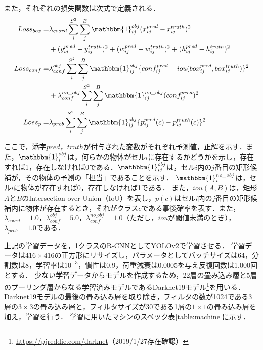     また，それぞれの損失関数は次式で定義される．
    \begin{align}
      Loss_{box} = &\lambda_{coord} \sum_{i}^{S^2} \sum_{j}^{B} \mathbbm{1}_{ij}^{obj} (x_{ij}^{pred} - x_{ij}^{truth})^2 \\
      &+ (y_{ij}^{pred} - y_{ij}^{truth})^2 + (w_{ij}^{pred} - w_{ij}^{truth})^2 + (h_{ij}^{pred} - h_{ij}^{truth})^2 \notag \\
      Loss_{conf} = &\lambda_{conf}^{obj} \sum_{i}^{S^2} \sum_{j}^{B} \mathbbm{1}_{ij}^{obj}
      \{ conf_{ij}^{pred} - iou(box_{ij}^{pred}, box_{ij}^{truth}) \}^2 \\
      &+ \lambda_{conf}^{no\_obj} \sum_{i}^{S^2} \sum_{j}^{B} \mathbbm{1}_{ij}^{no\_obj} (conf_{ij}^{pred})^2 \notag \\
      Loss_{p} = &\lambda_{prob} \sum_{i}^{S^2} \sum_{j}^{B} \mathbbm{1}_{ij}^{obj}
      \{ p_{ij}^{pred} (c) - p_{ij}^{truth} (c) \}^2
    \end{align}

    ここで，添字$pred$，$truth$が付与された変数がそれぞれ予測値，正解を示す．また，$\mathbbm{1}_{i}^{obj}$は，何らかの物体がセル$i$に存在するかどうかを示し，存在すれば1，存在しなければ0である．$\mathbbm{1}_{ij}^{obj}$は，セル$i$内の$j$番目の矩形候補が，その物体の予測の「担当」であることを示す．
    $\mathbbm{1}_{i}^{no\_obj}$は，セル$i$に物体が存在すれば0，存在しなければ1である．
    また，$iou(A, B)$は，矩形$A$と$B$のIntersection over Union（IoU）を表し，$p(c)$はセル$i$内の$j$番目の矩形候補内に物体が存在するとき，それがクラス$c$である事後確率を表す．また，$\lambda_{coord} = 1.0$，$\lambda_{conf}^{obj} = 5.0$，$\lambda_{conf}^{no\_obj} = 1.0$（ただし，$iou$が閾値未満のとき），$\lambda_{prob} = 1.0$である\cite{Nishikawa:2018}．

    上記の学習データを，1クラスのR-CNNとしてYOLOv2で学習させる．
    学習データは$416 \times 416$の正方形にリサイズし，パラメータとしてバッチサイズは64，分割数は8，学習率は$10^{-3}$，慣性は0.9，荷重減衰は0.0005を与え反復回数は1,000回とする．
    少ない学習データからモデルを作成するため，22層の畳み込み層と5層のプーリング層からなる学習済みモデルであるDarknet19モデル\footnote{\url{https://pjreddie.com/darknet}（2019/1/27存在確認）}を用いる．
    Darknet19モデルの最後の畳み込み層を取り除き，フィルタの数が1024である3層の$3 \times 3$の畳み込み層と，フィルタサイズが30である1層の$1 \times 1$の畳み込み層を加え，学習を行う．
    学習に用いたマシンのスペック表\ref{table:machine}に示す．

